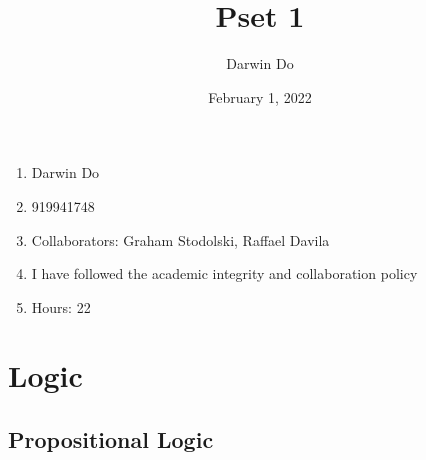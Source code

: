 \documentclass{article}
\title{Pset 1}
\begin{document}
\date{February 1, 2022 }
\author{Darwin Do}

\maketitle

\begin{enumerate}[label=(\alph*)]
    \item Darwin Do
    \item 919941748
    \item Collaborators: Graham Stodolski, Raffael Davila 
    \item I have followed the academic integrity and collaboration policy
    \item Hours: 22
\end{enumerate}

\newpage

\section{Logic}
\subsection{Propositional Logic}
\end{document}
